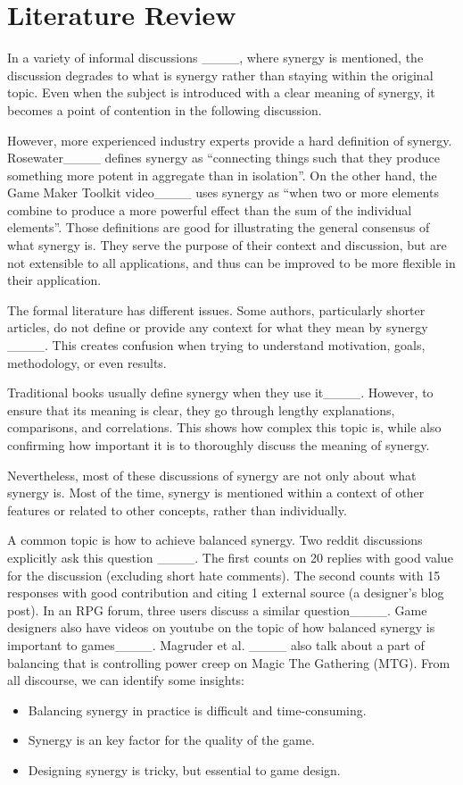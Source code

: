 \section{Literature Review}

In a variety of informal discussions ____, where synergy is mentioned, the discussion degrades to what is synergy rather than staying within the original topic. Even when the subject is introduced with a clear meaning of synergy, it becomes a point of contention in the following discussion.

However, more experienced industry experts provide a hard definition of synergy. Rosewater____ defines synergy as ``connecting things such that they produce something more potent in aggregate than in isolation''. On the other hand, the Game Maker Toolkit video____ uses synergy as ``when two or more elements combine to produce a more powerful effect than the sum of the individual elements''. Those definitions are good for illustrating the general consensus of what synergy is. They serve the purpose of their context and discussion, but are not extensible to all applications, and thus can be improved to be more flexible in their application.

The formal literature has different issues. Some authors, particularly shorter articles, do not define or provide any context for what they mean by synergy ____. This creates confusion when trying to understand motivation, goals, methodology, or even results.

Traditional books usually define synergy when they use it____. However, to ensure that its meaning is clear, they go through lengthy explanations, comparisons, and correlations. This shows how complex this topic is, while also confirming how important it is to thoroughly discuss the meaning of synergy.

Nevertheless, most of these discussions of synergy are not only about what synergy is. Most of the time, synergy is mentioned within a context of other features or related to other concepts, rather than individually.

A common topic is how to achieve balanced synergy. Two reddit discussions explicitly ask this question ____. The first counts on 20 replies with good value for the discussion (excluding short hate comments). The second counts with 15 responses with good contribution and citing 1 external source (a designer's blog post). In an RPG forum, three users discuss a similar question____. Game designers also have videos on youtube on the topic of how balanced synergy is important to games____. Magruder et al. ____ also talk about a part of balancing that is controlling power creep on Magic The Gathering (MTG). From all discourse, we can identify some insights:
\begin{itemize}
    \item Balancing synergy in practice is difficult and time-consuming.
    \item Synergy is an key factor for the quality of the game.
    \item Designing synergy is tricky, but essential to game design.
\end{itemize}

